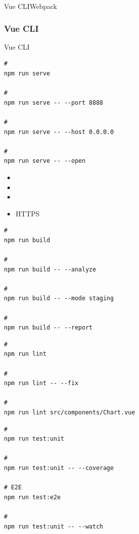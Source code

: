 Vue CLIWebpack

\hypertarget{vue-cli-3}{%
\subsubsection{Vue CLI}\label{vue-cli-3}}

Vue CLI

\important{}

\begin{lstlisting}[style=terminal]
# 
npm run serve

# 
npm run serve -- --port 8888

# 
npm run serve -- --host 0.0.0.0

# 
npm run serve -- --open
\end{lstlisting}

\begin{itemize}
\item
\item
\item
  \important{}
\item
  HTTPS
\end{itemize}

\important{}

\begin{lstlisting}[style=terminal]
# 
npm run build

# 
npm run build -- --analyze

# 
npm run build -- --mode staging

# 
npm run build -- --report
\end{lstlisting}

\important{}

\begin{lstlisting}[style=terminal]
# 
npm run lint

# 
npm run lint -- --fix

# 
npm run lint src/components/Chart.vue
\end{lstlisting}

\important{}

\begin{lstlisting}[style=terminal]
# 
npm run test:unit

# 
npm run test:unit -- --coverage

# E2E
npm run test:e2e

# 
npm run test:unit -- --watch
\end{lstlisting}

